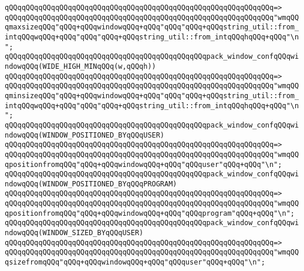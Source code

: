 \verb|qQQqqQQqqQQqqQQqqQQqqQQqqQQqqQQqqQQqqQQqqQQqqQQqqQQqqQQqqQQqqQQq=>|\newline
\verb|qQQqqQQqqQQqqQQqqQQqqQQqqQQqqQQqqQQqqQQqqQQqqQQqqQQqqQQqqQQqqQQq"wmqQQqmaxsizeqQQq"qQQq+qQQqwindowqQQq+qQQq"qQQq"qQQq+qQQqstring_util::from_intqQQqwqQQq+qQQq"qQQq"qQQq+qQQqstring_util::from_intqQQqhqQQq+qQQq"\n";|\newline
\newline
\verb|qQQqqQQqqQQqqQQqqQQqqQQqqQQqqQQqqQQqqQQqqQQqqQQqpack_window_confqQQqwindowqQQq(WIDE_HIGH_MINqQQq(w,qQQqh))|\newline
\verb|qQQqqQQqqQQqqQQqqQQqqQQqqQQqqQQqqQQqqQQqqQQqqQQqqQQqqQQqqQQqqQQq=>|\newline
\verb|qQQqqQQqqQQqqQQqqQQqqQQqqQQqqQQqqQQqqQQqqQQqqQQqqQQqqQQqqQQqqQQq"wmqQQqminsizeqQQq"qQQq+qQQqwindowqQQq+qQQq"qQQq"qQQq+qQQqstring_util::from_intqQQqwqQQq+qQQq"qQQq"qQQq+qQQqstring_util::from_intqQQqhqQQq+qQQq"\n";|\newline
\newline
\verb|qQQqqQQqqQQqqQQqqQQqqQQqqQQqqQQqqQQqqQQqqQQqqQQqpack_window_confqQQqwindowqQQq(WINDOW_POSITIONED_BYqQQqUSER)|\newline
\verb|qQQqqQQqqQQqqQQqqQQqqQQqqQQqqQQqqQQqqQQqqQQqqQQqqQQqqQQqqQQqqQQq=>|\newline
\verb|qQQqqQQqqQQqqQQqqQQqqQQqqQQqqQQqqQQqqQQqqQQqqQQqqQQqqQQqqQQqqQQq"wmqQQqpositionfromqQQq"qQQq+qQQqwindowqQQq+qQQq"qQQquser"qQQq+qQQq"\n";|\newline
\newline
\verb|qQQqqQQqqQQqqQQqqQQqqQQqqQQqqQQqqQQqqQQqqQQqqQQqpack_window_confqQQqwindowqQQq(WINDOW_POSITIONED_BYqQQqPROGRAM)|\newline
\verb|qQQqqQQqqQQqqQQqqQQqqQQqqQQqqQQqqQQqqQQqqQQqqQQqqQQqqQQqqQQqqQQq=>|\newline
\verb|qQQqqQQqqQQqqQQqqQQqqQQqqQQqqQQqqQQqqQQqqQQqqQQqqQQqqQQqqQQqqQQq"wmqQQqpositionfromqQQq"qQQq+qQQqwindowqQQq+qQQq"qQQqprogram"qQQq+qQQq"\n";|\newline
\newline
\verb|qQQqqQQqqQQqqQQqqQQqqQQqqQQqqQQqqQQqqQQqqQQqqQQqpack_window_confqQQqwindowqQQq(WINDOW_SIZED_BYqQQqUSER)|\newline
\verb|qQQqqQQqqQQqqQQqqQQqqQQqqQQqqQQqqQQqqQQqqQQqqQQqqQQqqQQqqQQqqQQq=>|\newline
\verb|qQQqqQQqqQQqqQQqqQQqqQQqqQQqqQQqqQQqqQQqqQQqqQQqqQQqqQQqqQQqqQQq"wmqQQqsizefromqQQq"qQQq+qQQqwindowqQQq+qQQq"qQQquser"qQQq+qQQq"\n";|\newline
\newline
